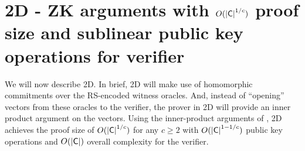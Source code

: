 \section{\name2D{} - ZK arguments with $O(\mathsf{|C|}^{1/c})$ proof size and sublinear public key operations for verifier}
We will now describe \name2D{}. In brief, \name2D{} will make use of homomorphic commitments over the RS-encoded witness oracles.
And, instead of ``opening'' vectors from these oracles to the verifier, the prover in \name2D{} will provide an inner product argument on the vectors.
Using the inner-product arguments of \cite{InnerProductDLS, Bulletproofs}, \name2D{} achieves the proof size of $O(\mathsf{|C|}^{1/c})$ for any $c \geq 2$ with $O(\mathsf{|C|}^{1-1/c})$ public key operations and $O(\mathsf{|C|})$ overall complexity for the verifier. 

